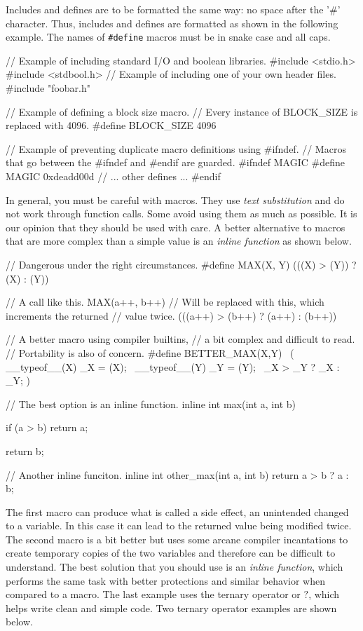 \documentclass[11pt]{article}
\begin{document}
Includes and defines are to be formatted the same way: no space after the '\#'
character. Thus, includes and defines are formatted as shown in the following
example. The names of \texttt{\#define} macros must be in snake case and all
caps.

\begin{clisting}{}
// Example of including standard I/O and boolean libraries.
#include <stdio.h>
#include <stdbool.h>
// Example of including one of your own header files.
#include "foobar.h"

// Example of defining a block size macro.
// Every instance of BLOCK_SIZE is replaced with 4096.
#define BLOCK_SIZE 4096

// Example of preventing duplicate macro definitions using #ifndef.
// Macros that go between the #ifndef and #endif are guarded.
#ifndef MAGIC
#define MAGIC 0xdeadd00d
// ... other defines ...
#endif
\end{clisting}

In general, you must be careful with macros. They use \emph{text substitution}
and do not work through function calls. Some avoid using them as much as
possible. It is our opinion that they should be used with care. A better
alternative to macros that are more complex than a simple value is an
\emph{inline function} as shown below.

\begin{clisting}{}
// Dangerous under the right circumstances.
#define MAX(X, Y) (((X) > (Y)) ? (X) : (Y))

// A call like this.
MAX(a++, b++)
// Will be replaced with this, which increments the returned
// value twice.
(((a++) > (b++) ? (a++) : (b++))

// A better macro using compiler builtins,
// a bit complex and difficult to read.
// Portability is also of concern.
#define BETTER_MAX(X,Y) \
    ({ __typeof__(X) _X = (X); \
     __typeof__(Y) _Y = (Y);  \
     _X > _Y ? _X : _Y; })

// The best option is an inline function.
inline int max(int a, int b) {
    if (a > b) {
        return a;
    }

    return b;
}

// Another inline funciton.
inline int other_max(int a, int b) {
    return a > b ? a : b;
}
\end{clisting}

The first macro can produce what is called a side effect, an unintended changed
to a variable. In this case it can lead to the returned value being modified
twice.  The second macro is a bit better but uses some arcane compiler
incantations to create temporary copies of the two variables and therefore can
be difficult to understand. The best solution that you should use is an
\emph{inline function}, which performs the same task with better protections and
similar behavior when compared to a macro. The last example uses the ternary
operator or $?$, which helps write clean and simple code. Two ternary operator
examples are shown below.
\end{document}
